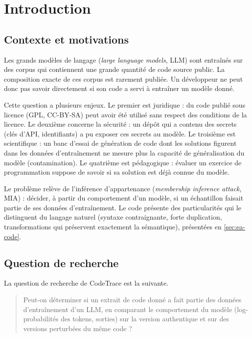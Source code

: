 \section{Introduction}\label{sec:introduction}
	\subsection{Contexte et motivations}\label{sec:intro-contexte}
		Les grands modèles de langage (\emph{large language models}, LLM) sont entraînés sur des corpus qui contiennent une grande quantité de code source public. La composition exacte de ces corpus est rarement publiée. Un développeur ne peut donc pas savoir directement si son code a servi à entraîner un modèle donné.

		Cette question a plusieurs enjeux. Le premier est juridique : du code publié sous licence (GPL, CC-BY-SA) peut avoir été utilisé sans respect des conditions de la licence. Le deuxième concerne la sécurité : un dépôt qui a contenu des secrets (clés d'API, identifiants) a pu exposer ces secrets au modèle. Le troisième est scientifique : un banc d'essai de génération de code dont les solutions figurent dans les données d'entraînement ne mesure plus la capacité de généralisation du modèle (contamination). Le quatrième est pédagogique : évaluer un exercice de programmation suppose de savoir si sa solution est déjà connue du modèle.

		Le problème relève de l'inférence d'appartenance (\emph{membership inference attack}, MIA) : décider, à partir du comportement d'un modèle, si un échantillon faisait partie de ses données d'entraînement. Le code présente des particularités qui le distinguent du langage naturel (syntaxe contraignante, forte duplication, transformations qui préservent exactement la sémantique), présentées en \cref{sec:ea-code}.

	\subsection{Question de recherche}\label{sec:intro-question}
		La question de recherche de CodeTrace est la suivante.

		\begin{quote}
			Peut-on déterminer si un extrait de code donné a fait partie des données d'entraînement d'un LLM, en comparant le comportement du modèle (log-probabilités des tokens, sorties) sur la version authentique et sur des versions perturbées du même code ?
		\end{quote}

